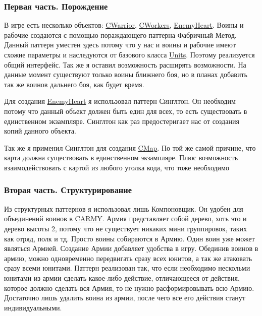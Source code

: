 \subsubsection*{Первая часть. Порождение}

В игре есть несколько объектов\+: \hyperlink{classCWarrior}{C\+Warrior}, \hyperlink{classCWorkers}{C\+Workers}, \hyperlink{classEnemyHeart}{Enemy\+Heart}. Воины и рабочие создаются с помощью пораждающего паттерна Фабричный Метод. Данный паттерн уместен здесь потому что у нас и воины и рабочие имеют схожие параметры и наследуются от базового класса \hyperlink{classUnits}{Units}. Поэтому реализуется общий интерфейс. Так же я оставил возможность расширять возможности. На данные момент существуют только воины ближнего боя, но в планах добавить так же воинов дальнего боя, как будет время.

Для создания \hyperlink{classEnemyHeart}{Enemy\+Heart} я использовал паттерн Синглтон. Он необходим потому что данный объект должен быть един для всех, то есть существовать в единственном экзампляре. Синглтон как раз предостеригает нас от создания копий данного объекта.

Так же я применил Синглтон для создания \hyperlink{classCMap}{C\+Map}. По той же самой причине, что карта должна существовать в единственном экзампляре. Плюс возможность взаимодействовать с картой из любого уголка кода, что тоже необходимо

\subsubsection*{Вторая часть. Структурирование}

Из структурных паттернов я использовал лишь Компоновщик. Он удобен для объединений воинов в \hyperlink{classCARMY}{C\+A\+R\+MY}. Армия представляет собой дерево, хоть это и дерево высоты 2, потому что не существует никаких мини группировок, таких как отряд, полк и тд. Просто воины собираются в Армию. Один воин уже может являться Армией. Создание Армии добавляет удобства в игру. Обединив воинов в армию, можно одновременно передвигать сразу всех юнитов, а так же атаковать сразу всеми юнитами. Паттерн реализован так, что если необходимо нескольми юнитами из армии сделать какое-\/либо действие, отличающееся от действия, которое должно сделать вся Армия, то не нужно расформировывать всю Армию. Достаточно лишь удалить воина из армии, после чего все его действия станут индивидуальными.